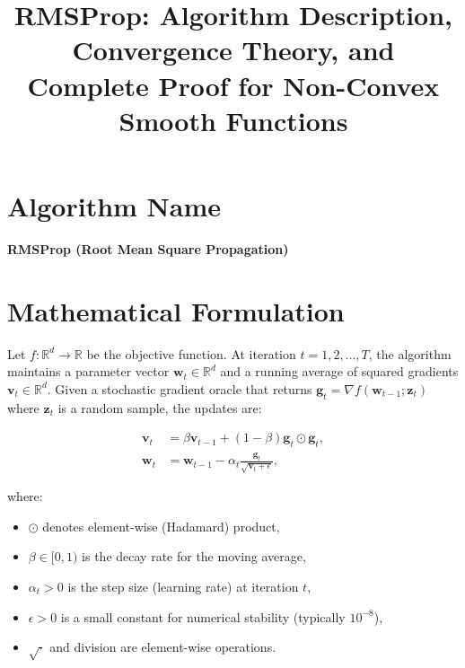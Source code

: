 \documentclass{article}
\newcommand{\R}{\mathbb{R}}
\newcommand{\grad}{\nabla}
\newcommand{\vect}[1]{\bm{#1}}
\begin{document}
\title{RMSProp: Algorithm Description, Convergence Theory, and Complete Proof for Non-Convex Smooth Functions}
\author{}
\date{}
\maketitle


\section*{Algorithm Name}
\textbf{RMSProp (Root Mean Square Propagation)}

\section*{Mathematical Formulation}

Let \(f: \R^d \to \R\) be the objective function. At iteration \(t = 1,2,\dots,T\), the algorithm maintains a parameter vector \(\vect{w}_t \in \R^d\) and a running average of squared gradients \(\vect{v}_t \in \R^d\). Given a stochastic gradient oracle that returns \(\vect{g}_t = \grad f(\vect{w}_{t-1}; \vect{z}_t)\) where \(\vect{z}_t\) is a random sample, the updates are:

\begin{align}
\vect{v}_t &= \beta \vect{v}_{t-1} + (1-\beta) \vect{g}_t \odot \vect{g}_t, \label{eq:v_update} \\
\vect{w}_t &= \vect{w}_{t-1} - \alpha_t \frac{\vect{g}_t}{\sqrt{\vect{v}_t + \epsilon}}, \label{eq:w_update}
\end{align}

where:
\begin{itemize}
    \item \(\odot\) denotes element-wise (Hadamard) product,
    \item \(\beta \in [0,1)\) is the decay rate for the moving average,
    \item \(\alpha_t > 0\) is the step size (learning rate) at iteration \(t\),
    \item \(\epsilon > 0\) is a small constant for numerical stability (typically \(10^{-8}\)),
    \item \(\sqrt{\cdot}\) and division are element-wise operations.
\end{itemize}
\end{document}
